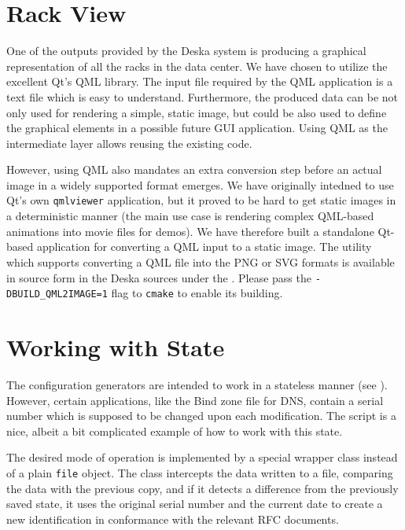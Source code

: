 \documentclass[deska]{subfiles}
\begin{document}
\section{Rack View}
One of the outputs provided by the Deska system is producing a graphical representation of all the racks in the data
center.  We have chosen to utilize the excellent Qt's QML library.  The input file required by the QML application is a
text file which is easy to understand.  Furthermore, the produced data can be not only used for rendering a simple,
static image, but could be also used to define the graphical elements in a possible future GUI application.  Using QML
as the intermediate layer allows reusing the existing code.

However, using QML also mandates an extra conversion step before an actual image in a widely supported format emerges.
We have originally intedned to use Qt's own {\tt qmlviewer} application, but it proved to be hard to get static images
in a deterministic manner (the main use case is rendering complex QML-based animations into movie files for demos).  We
have therefore built a standalone Qt-based application for converting a QML input to a static image.  The utility which
supports converting a QML file into the PNG or SVG formats is available in source form in the Deska sources under the
.  Please pass the {\tt -DBUILD\_QML2IMAGE=1} flag to {\tt cmake} to enable its building.

\section{Working with State}

The configuration generators are intended to work in a stateless manner (see ).  However,
certain applications, like the Bind zone file for DNS, contain a serial number which is supposed to be changed upon each
modification.  The  script is a nice, albeit a bit complicated example of how to work with this state.

The desired mode of operation is implemented by a special wrapper class instead of a plain {\tt file} object.  The class
intercepts the data written to a file, comparing the data with the previous copy, and if it detects a difference from
the previously saved state, it uses the original serial number and the current date to create a new identification in
conformance with the relevant RFC documents.

\end{document}
